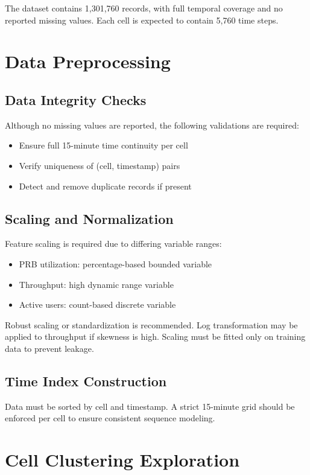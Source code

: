 \documentclass[conference]{IEEEtran}
\begin{document}
The dataset contains 1,301,760 records, with full temporal coverage and no reported missing values. Each cell is expected to contain 5,760 time steps.

\section{Data Preprocessing}

\subsection{Data Integrity Checks}
Although no missing values are reported, the following validations are required:
\begin{itemize}
\item Ensure full 15-minute time continuity per cell
\item Verify uniqueness of (cell, timestamp) pairs
\item Detect and remove duplicate records if present
\end{itemize}

\subsection{Scaling and Normalization}
Feature scaling is required due to differing variable ranges:
\begin{itemize}
\item PRB utilization: percentage-based bounded variable
\item Throughput: high dynamic range variable
\item Active users: count-based discrete variable
\end{itemize}

Robust scaling or standardization is recommended. Log transformation may be applied to throughput if skewness is high. Scaling must be fitted only on training data to prevent leakage.

\subsection{Time Index Construction}
Data must be sorted by cell and timestamp. A strict 15-minute grid should be enforced per cell to ensure consistent sequence modeling.

\section{Cell Clustering Exploration}
\end{document}
